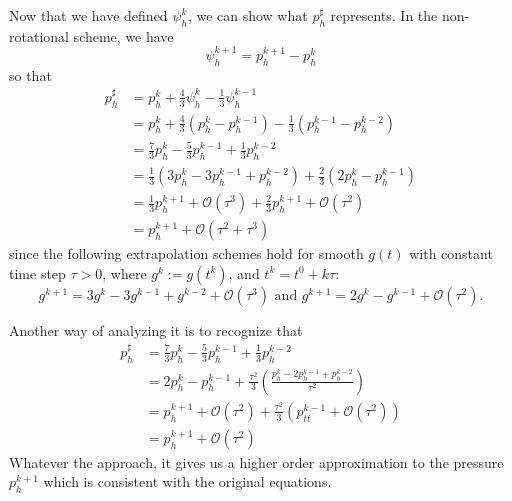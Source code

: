 \documentclass[letterpaper]{erdc}
\begin{document}
\begin{remark}
  Now that we have defined $\psi_h^{k}$, we can show what $p_h^{\sharp}$
  represents.  In the non-rotational scheme, we have
\begin{equation}
  \psi_h^{k+1} = p_h^{k+1} - p_h^{k}
\end{equation}
so that
  \begin{align}
    p_h^{\sharp} &= p_h^{k} + \frac{4}{3}\psi_h^{k} - \frac{1}{3}\psi_h^{k-1}\\
    &= p_h^{k} + \frac{4}{3}\left(p_h^{k} - p_h^{k-1}\right) - \frac{1}{3}\left(p_h^{k-1} - p_h^{k-2}\right)\\
    &= \frac{7}{3}p_h^{k} - \frac{5}{3}p_h^{k-1}+ \frac{1}{3}p_h^{k-2} \\
    &= \frac{1}{3}\left( 3p_h^{k} - 3p_h^{k-1} + p_h^{k-2} \right) + \frac{2}{3}\left(2p_h^{k} - p_h^{k-1}  \right)\\
    &= \frac{1}{3}p_h^{k+1} + \mathcal{O}(\tau^{3}) + \frac{2}{3} p_h^{k+1} + \mathcal{O}(\tau^{2})\\
    &= p_h^{k+1} + \mathcal{O}\left(\tau^2+\tau^3\right)
  \end{align}
  since the following extrapolation schemes hold for smooth $g(t)$ with
  constant time step $\tau>0$, where $g^{k} := g\left(t^{k}\right)$, and
  $t^k = t^0+k\tau$:
  \begin{equation}
    g^{k+1} = 3g^k - 3g^{k-1}+g^{k-2} + \mathcal{O}(\tau^3) \mbox{ and } g^{k+1}=2g^{k} - g^{k-1}+\mathcal{O}(\tau^2).
  \end{equation}
  
  Another way of analyzing it is to recognize that
  \begin{align}
    p^{\sharp}_h &= \frac{7}{3}p_h^{k} - \frac{5}{3}p_h^{k-1}+ \frac{1}{3}p_h^{k-2} \\
    &= 2p_h^k - p_h^{k-1} + \frac{\tau^2}{3}\left(\frac{p_h^{k} - 2p^{k-1}_h + p_h^{k-2}}{\tau^2}  \right)\\
    &= p_h^{k+1} + \mathcal{O}(\tau^{2}) + \frac{\tau^2}{3}\left( p_{tt}^{k-1} + \mathcal{O}(\tau^{2}) \right)\\
    &= p_h^{k+1} + \mathcal{O}(\tau^2)
  \end{align}
  Whatever the approach, it gives us a higher order approximation to the
  pressure $p_h^{k+1}$ which is consistent with the original equations.
  

\end{remark}
\end{document}
